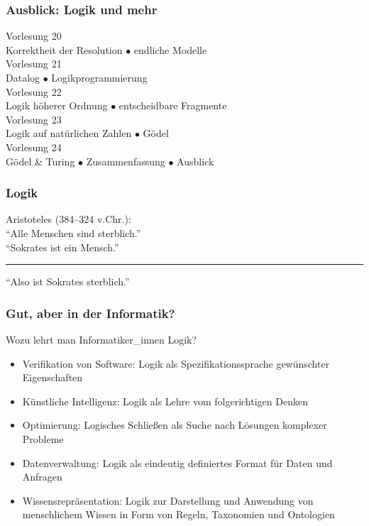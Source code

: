 \documentclass[aspectratio=1610,onlymath]{beamer}
\begin{document}
\begin{frame}\frametitle{Ausblick: Logik und mehr}

\begin{center}
\alert{Vorlesung 20}\\
Korrektheit der Resolution $\bullet$ endliche Modelle\\[1ex]
\alert{Vorlesung 21}\\
Datalog $\bullet$ Logikprogrammierung \\[1ex]
\alert{Vorlesung 22}\\
Logik höherer Ordnung $\bullet$ entscheidbare Fragmente\\[1ex]
\alert{Vorlesung 23}\\
Logik auf natürlichen Zahlen $\bullet$ Gödel\\[1ex]
\alert{Vorlesung 24}\\
Gödel \& Turing $\bullet$ Zusammenfassung $\bullet$ Ausblick
\end{center}

\end{frame}


\begin{frame}\frametitle{Logik}

\begin{center}
Aristoteles (384--324 v.Chr.):\\[1cm]

"`Alle Menschen sind sterblich."'\\
"`Sokrates ist ein Mensch."'\\
\rule{7cm}{1pt}

"`Also ist Sokrates sterblich."'

\end{center}

\end{frame}

\begin{frame}\frametitle{Gut, aber in der Informatik?}

Wozu lehrt man Informatiker\_innen Logik?
\begin{itemize}
\item \alert{Verifikation von Software:} Logik als Spezifikationssprache gewünschter Eigenschaften
\item \alert{Künstliche Intelligenz:} Logik als Lehre vom folgerichtigen Denken
\item \alert{Optimierung:} Logisches Schließen als Suche nach Lösungen komplexer Probleme
\item \alert{Datenverwaltung:} Logik als eindeutig definiertes Format für Daten und Anfragen
\item \alert{Wissensrepräsentation:} Logik zur Darstellung und Anwendung von menschlichem Wissen in Form von Regeln, Taxonomien und Ontologien
\end{itemize}

\end{frame}
\end{document}

